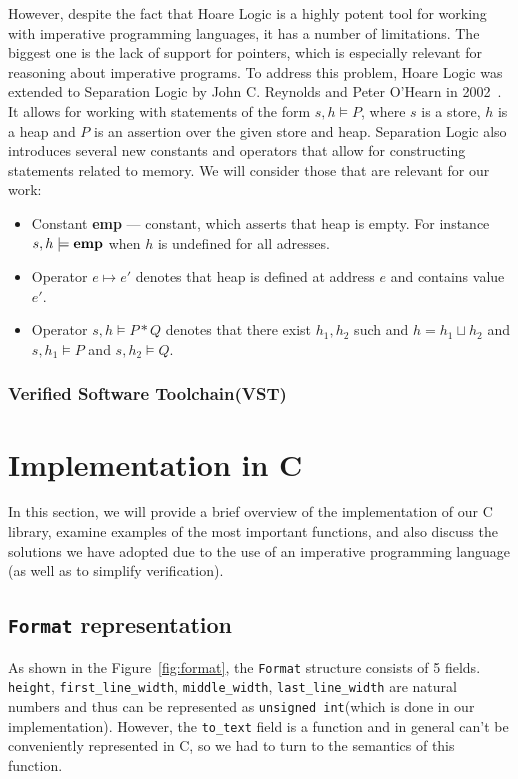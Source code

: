 \documentclass[14pt]{constructor-diploma}
\begin{document}
However, despite the fact that Hoare Logic is a highly potent tool for working with imperative programming languages, 
it has a number of limitations. The biggest one is the lack of support for pointers, 
which is especially relevant for reasoning about imperative programs. To address this problem, 
Hoare Logic was extended to Separation Logic by John C. Reynolds and Peter O'Hearn in 2002~\cite{reynolds}. 
It allows for working with statements of the form $s, h \models P$, where $s$ is a store, $h$ is a heap and 
$P$ is an assertion over the given store and heap.
Separation Logic also introduces several new constants and operators that allow for constructing
statements related to memory. We will consider those that are relevant for our work:
\begin{itemize}
  \item Constant \textbf{emp} --- constant, which asserts that heap is empty. For instance
  $s, h \models \bf{emp}$ when $h$ is undefined for all adresses.
  \item Operator $e \mapsto e'$ denotes that heap is defined at address $e$ and contains value $e'$.
  \item Operator $s, h \models P * Q$ denotes that there exist $h_1, h_2$ such
  and $h = h_1 \sqcup h_2$ and $s, h_1 \models P$ and $s, h_2 \models Q$.
\end{itemize}

\subsubsection{Verified Software Toolchain(VST)}

\section{Implementation in C}
In this section, we will provide a brief overview of the implementation of our C library, 
examine examples of the most important functions, 
and also discuss the solutions we have adopted due 
to the use of an imperative programming language (as well as to simplify verification).

\subsection{\texttt{Format} representation}
As shown in the Figure~\ref{fig:format}, the \texttt{Format} structure consists of 5 fields. \texttt{height},
\texttt{first\_line\_width}, \texttt{middle\_width}, \texttt{last\_line\_width} are
natural numbers and thus can be represented as \texttt{unsigned int}(which is done in our implementation).
However, the \texttt{to\_text} field is a function and in general can't be conveniently represented in C, so
we had to turn to the semantics of this function.
\end{document}

